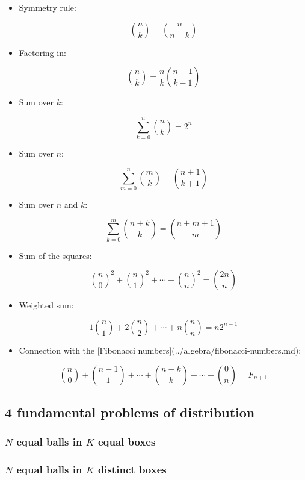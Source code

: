 \begin{itemize}
    \item Symmetry rule:

    \[ \binom n k = \binom n {n-k} \]

    \item Factoring in:

    \[ \binom n k = \frac n k \binom {n-1} {k-1} \]

    \item Sum over $k$:

    \[ \sum_{k = 0}^n \binom n k = 2 ^ n \]

    \item Sum over $n$:

    \[ \sum_{m = 0}^n \binom m k = \binom {n + 1} {k + 1} \]

    \item Sum over $n$ and $k$:

    \[ \sum_{k = 0}^m  \binom {n + k} k = \binom {n + m + 1} m \]

    \item Sum of the squares:

    \[ {\binom n 0}^2 + {\binom n 1}^2 + \cdots + {\binom n n}^2 = \binom {2n} n \]

    \item Weighted sum:

    \[ 1 \binom n 1 + 2 \binom n 2 + \cdots + n \binom n n = n 2^{n-1} \]

    \item Connection with the [Fibonacci numbers](../algebra/fibonacci-numbers.md):

    \[ \binom n 0 + \binom {n-1} 1 + \cdots + \binom {n-k} k + \cdots + \binom 0 n = F_{n+1} \]

\end{itemize}



\subsection{4 fundamental problems of distribution}

\subsubsection{$N$ equal balls in $K$ equal boxes}

\subsubsection{$N$ equal balls in $K$ distinct boxes}

